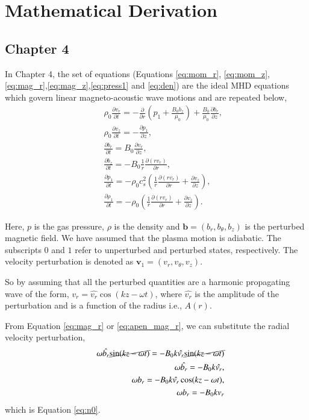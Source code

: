 \chapter{Mathematical Derivation} 

\section*{Chapter 4}

In Chapter 4, the set of equations (Equations \ref{eq:mom_r}, \ref{eq:mom_z},\ref{eq:mag_r},\ref{eq:mag_z},\ref{eq:press1} and \ref{eq:den}) are the ideal MHD equations which govern linear magneto-acoustic wave motions and are repeated below,
\begin{align}
    &&\rho_0 \frac{\partial v_r}{\partial t}=-\frac{\partial}{\partial r}
    \left(p_1+\frac{B_0b_z}{\mu_0}\right)+\frac{B_0}{\mu_0}\frac{\partial b_r}{\partial z},
    \label{eq:apen_mom_r}\\
    &&\rho_0\frac{\partial v_z}{\partial t}=-\frac{\partial p_1}{\partial z},
    \label{eq:apen_mom_z}\\
    &&\frac{\partial b_r}{\partial t}=B_0\frac{\partial v_r}{\partial z},
    \label{eq:apen_mag_r}\\
    &&\frac{\partial b_z}{\partial t}=-B_0\frac{1}{r}\frac{\partial (rv_r)}{\partial r},
    \label{eq:apen_mag_z}\\
    &&\frac{\partial p_1}{\partial t}=-\rho_0
    c_s^2\left(\frac{1}{r}\frac{\partial(rv_r)}{\partial r}+\frac{\partial v_z}{\partial z}\right),
    \label{eq:apen_press1}\\
    &&\frac{\partial \rho_1}{\partial t}=-\rho_0\left(\frac{1}{r}\frac{\partial (rv_r)}{\partial r}+\frac{\partial v_z}{\partial z}\right).
    \label{eq:apen_den}
\end{align}

Here, $p$ is the gas pressure, $\rho$ is the density and $\textbf{b} = (b_r,b_{\theta},b_z)$ is the perturbed magnetic field.
We have assumed that the plasma motion is adiabatic.
The subscripts $0$ and $1$ refer to unperturbed and perturbed states, respectively.
The velocity perturbation is denoted as $\textbf{v}_1= (v_r,v_{\theta},v_z)$.

So by assuming that all the perturbed quantities are a harmonic propagating wave of the form, $v_r=\hat{v_r}\cos(kz-\omega t)$, where $\hat{v_r}$ is the amplitude of the perturbation and is a function of the radius i.e., $A(r)$.

From Equation \ref{eq:mag_r} or \ref{eq:apen_mag_r}, we can substitute the radial velocity perturbation,
\begin{align}
&&\omega \hat{b_r} \cancel{\sin(kz-\omega t)} = -B_0k\hat{v_r} \cancel{\sin(kz-\omega t)}\\
&&\omega \hat{b_r}= -B_0k\hat{v_r},\label{eq:brhat}\\
&&\omega b_r=-B_0k\hat{v_r}\cos(kz-\omega t),\\
&&\omega b_r=-B_0k{v_r}
\end{align}
which is Equation \ref{eq:n0}.

